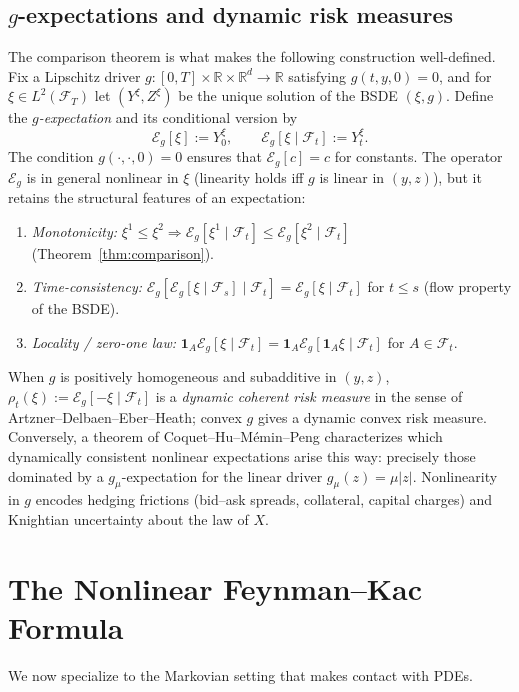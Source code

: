 \documentclass{article}
\newcommand{\R}{\mathbb{R}}
\newcommand{\F}{\mathcal{F}}
\begin{document}
\subsection{$g$-expectations and dynamic risk measures}

The comparison theorem is what makes the following construction well-defined. Fix a Lipschitz driver $g : [0,T] \times \R \times \R^d \to \R$ satisfying $g(t, y, 0) = 0$, and for $\xi \in L^2(\F_T)$ let $(Y^\xi, Z^\xi)$ be the unique solution of the BSDE $(\xi, g)$. Define the \emph{$g$-expectation} and its conditional version by
\[
  \mathcal{E}_g[\xi] := Y^\xi_0, \qquad \mathcal{E}_g[\xi \mid \F_t] := Y^\xi_t.
\]
The condition $g(\cdot, \cdot, 0) = 0$ ensures that $\mathcal{E}_g[c] = c$ for constants. The operator $\mathcal{E}_g$ is in general nonlinear in $\xi$ (linearity holds iff $g$ is linear in $(y, z)$), but it retains the structural features of an expectation:
\begin{enumerate}
  \item[(M)] \emph{Monotonicity:} $\xi^1 \le \xi^2 \Rightarrow \mathcal{E}_g[\xi^1 \mid \F_t] \le \mathcal{E}_g[\xi^2 \mid \F_t]$ (Theorem~\ref{thm:comparison}).
  \item[(T)] \emph{Time-consistency:} $\mathcal{E}_g[\mathcal{E}_g[\xi \mid \F_s] \mid \F_t] = \mathcal{E}_g[\xi \mid \F_t]$ for $t \le s$ (flow property of the BSDE).
  \item[(L)] \emph{Locality / zero-one law:} $\mathbf{1}_A \mathcal{E}_g[\xi \mid \F_t] = \mathbf{1}_A \mathcal{E}_g[\mathbf{1}_A \xi \mid \F_t]$ for $A \in \F_t$.
\end{enumerate}
When $g$ is positively homogeneous and subadditive in $(y, z)$, $\rho_t(\xi) := \mathcal{E}_g[-\xi \mid \F_t]$ is a \emph{dynamic coherent risk measure} in the sense of Artzner--Delbaen--Eber--Heath; convex $g$ gives a dynamic convex risk measure. Conversely, a theorem of Coquet--Hu--M\'emin--Peng characterizes which dynamically consistent nonlinear expectations arise this way: precisely those dominated by a $g_\mu$-expectation for the linear driver $g_\mu(z) = \mu|z|$. Nonlinearity in $g$ encodes hedging frictions (bid--ask spreads, collateral, capital charges) and Knightian uncertainty about the law of $X$.

\section{The Nonlinear Feynman--Kac Formula}

We now specialize to the Markovian setting that makes contact with PDEs.
\end{document}
